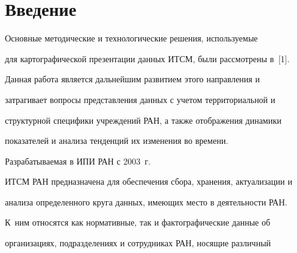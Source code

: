      




     










      \thispagestyle{headings}





      


            \label{st\stat}


            


            \vspace*{-9pt}


     


     \section{Введение}


     


     Основные методические и технологические решения, используемые 


для картографической презентации данных ИТСМ, были рассмотрены в~[1]. 


Данная работа является дальнейшим развитием этого направления и 


затрагивает вопросы представления данных с учетом территориальной и 


структурной специфики уч\-реж\-де\-ний РАН, а также отображения динамики 


показателей и анализа тенденций их изменения во времени.


     


     Разрабатываемая в ИПИ РАН с 2003~г.\ 


     ИТСМ  РАН предназначена для обеспечения сбора, хранения, актуализации и 


анализа определенного круга данных, имеющих место в деятельности РАН. 


К~ним относятся как нормативные, так и фактографические данные об 


организациях, подразделениях и сотрудниках РАН, носящие различный 


